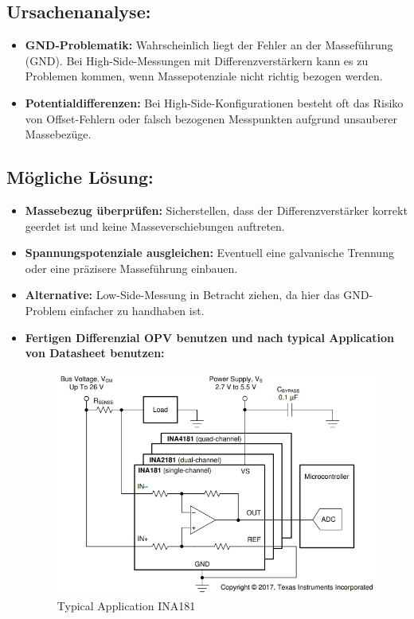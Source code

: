 \documentclass[12pt, a4paper]{article}
\begin{document}
\subsection{Ursachenanalyse:}
\begin{itemize}
    \item \textbf{GND-Problematik:} Wahrscheinlich liegt der Fehler an der Masseführung (GND). Bei High-Side-Messungen mit Differenzverstärkern kann es zu Problemen kommen, wenn Massepotenziale nicht richtig bezogen werden.
    \item \textbf{Potentialdifferenzen:} Bei High-Side-Konfigurationen besteht oft das Risiko von Offset-Fehlern oder falsch bezogenen Messpunkten aufgrund unsauberer Massebezüge.
\end{itemize}
\newpage

\subsection{Mögliche Lösung:}
\begin{itemize}
    \item \textbf{Massebezug überprüfen:} Sicherstellen, dass der Differenzverstärker korrekt geerdet ist und keine Masseverschiebungen auftreten.
    \item \textbf{Spannungspotenziale ausgleichen:} Eventuell eine galvanische Trennung oder eine präzisere Masseführung einbauen.
    \item \textbf{Alternative:} Low-Side-Messung in Betracht ziehen, da hier das GND-Problem einfacher zu handhaben ist.
    \item \textbf{Fertigen Differenzial OPV benutzen und nach typical Application von Datasheet benutzen:} \cite{INA}
    \begin{figure}[hbtp]
		\centering
		\includegraphics[width=1\textwidth]{images/new.png}
		\caption{Typical Application INA181}
		\label{fig:HUB-Analyse}
	\end{figure}
\end{itemize}
\end{document}
